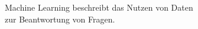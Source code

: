 \documentclass[preview]{standalone}
\begin{document}
\begin{center}
Machine Learning beschreibt das Nutzen von Daten \\ zur Beantwortung von Fragen.
\end{center}
\end{document}
